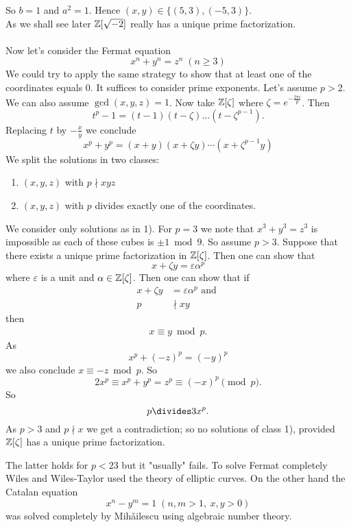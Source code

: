 \documentclass[NumTh.tex]{subfiles}
\begin{document}
So $b = 1$ and $a^2 = 1$.
Hence $(x,y) \in \{(5,3), (-5,3)\}$.
\\
As we shall see later $\mathbb{Z}[\sqrt{-2}]$ really has a unique prime factorization.\\
\\
Now let's consider the Fermat equation
\[ x^n + y^n = z^n \; (n\geq 3) \]
We could try to apply the same strategy to show that at least one of the coordinates equals $0$.
It suffices to consider prime exponents. Let's assume $p > 2$.
We can also assume $\gcd(x,y,z) = 1$.
Now take $\mathbb{Z}[\zeta]$ where $\zeta = e^{-\frac{2\pi i}{p}}$.
Then
\[ t^p - 1 = (t-1)(t-\zeta)\dots (t-\zeta^{p-1}) \text{.} \]
Replacing $t$ by $- \frac{x}{y}$ we conclude
\[ x^p + y^p = (x+y)(x + \zeta y) \cdots (x + \zeta^{p-1}y) \]
We split the solutions in two classes:
\begin{enumerate}
  \item $(x,y,z)$ with $p \nmid xyz$
  \item $(x,y,z)$ with $p$ divides exactly one of the coordinates.
\end{enumerate}
We consider only solutions as in 1).
For $p = 3$ we note that $x^3 + y^3 = z^3$ is impossible as each of these cubes is $\pm 1 \bmod 9$.
So assume $p>3$.
Suppose that there exists a unique prime factorization in $\mathbb{Z}[\zeta]$. 
Then one can show that 
\[ x + \zeta y = \varepsilon \alpha^p \] 
where $\varepsilon$ is a unit and $\alpha \in \mathbb{Z}[\zeta]$.
Then one can show that if
\begin{align*}
  x+ \zeta y &= \varepsilon \alpha^p \text{ and } \\ 
  p &\nmid xy
\end{align*}
then
\begin{align*}
  x \equiv y \bmod p \text{.}
\end{align*}
As 
\[ x^p + (-z)^p = (-y)^p\]
we also conclude $x  \equiv -z \bmod p$.
So 
\[ 2x^p \equiv x^p + y^p = z^p \equiv (-x)^p \pmod p \text{.} \]
So 
\[ p \divides 3 x^p \text{.} \]
As $p > 3$ and $p \nmid x$ we get a contradiction; so no solutions of class 1), provided $\mathbb{Z}[\zeta]$ has a unique prime factorization.

The latter holds for $p < 23$ but it "usually" fails.
To solve Fermat completely Wiles and Wiles-Taylor used the theory of elliptic curves.
On the other hand the Catalan equation
\[ x^n - y^m = 1 \; (n,m > 1,\:x,y >0) \]
was solved completely by Mih\v{a}ilescu using algebraic number theory.
\end{document}
